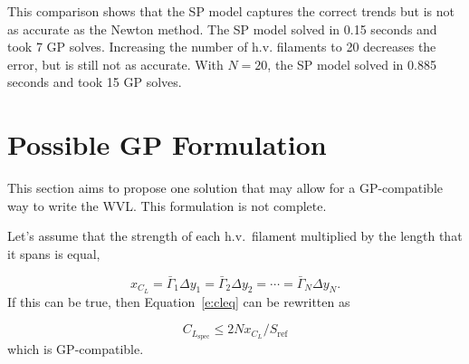 \documentclass[10pt, a4paper]{article}
\begin{document}
This comparison shows that the SP model captures the correct trends but is not as accurate as the Newton method.  The SP model solved in 0.15 seconds and took 7 GP solves.  Increasing the number of h.v. filaments to 20 decreases the error, but is still not as accurate.  With $N=20$, the SP model solved in 0.885 seconds and took 15 GP solves. 
 
\section*{Possible GP Formulation}

This section aims to propose one solution that may allow for a GP-compatible way to write the WVL.  This formulation is not complete. 

Let's assume that the strength of each h.v.\ filament multiplied by the length that it spans is equal, 

\begin{equation}
    x_{C_L} = \bar{\Gamma}_1 \Delta y_1 = \bar{\Gamma}_2 \Delta y_2 = \cdots = \bar{\Gamma}_N \Delta y_N.
\end{equation}
If this can be true, then Equation~\ref{e:cleq} can be rewritten as

\begin{equation}
    C_{L_{\mathrm{spec}}} \leq 2Nx_{C_L}/S_{\mathrm{ref}}
\end{equation}
which is GP-compatible. 
\end{document}
